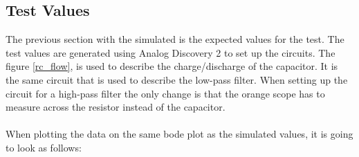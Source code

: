 \subsection{Test Values}
The previous section with the simulated is the expected values for the test. The test values are generated using Analog Discovery 2 to set up the circuits. The figure \ref{rc_flow}, is used to describe the charge/discharge of the capacitor. It is the same circuit that is used to describe the low-pass filter. When setting up the circuit for a high-pass filter the only change is that the orange scope has to measure across the resistor instead of the capacitor. 
\\ \\ 
When plotting the data on the same bode plot as the simulated values, it is going to look as follows: \\
